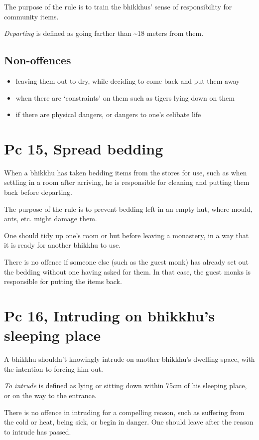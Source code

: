 The purpose of the rule is to train the bhikkhus' sense of
responsibility for community items.

\emph{Departing} is defined as going farther than \textasciitilde18
meters from them.

\subsection{Non-offences}

\begin{itemize}
\tightlist
\item
  leaving them out to dry, while deciding to come back and put them away
\item
  when there are `constraints' on them such as tigers lying down on them
\item
  if there are physical dangers, or dangers to one's celibate life
\end{itemize}

\section{Pc 15, Spread bedding}

When a bhikkhu has taken bedding items from the stores for use, such as
when settling in a room after arriving, he is responsible for cleaning
and putting them back before departing.

The purpose of the rule is to prevent bedding left in an empty hut,
where mould, ants, etc. might damage them.

One should tidy up one's room or hut before leaving a monastery, in a
way that it is ready for another bhikkhu to use.

There is no offence if someone else (such as the guest monk) has already
set out the bedding without one having asked for them. In that case, the
guest monks is responsible for putting the items back.

\section{Pc 16, Intruding on bhikkhu's sleeping place}

A bhikkhu shouldn't knowingly intrude on another bhikkhu's dwelling
space, with the intention to forcing him out.

\emph{To intrude} is defined as lying or sitting down within 75cm of his
sleeping place, or on the way to the entrance.

There is no offence in intruding for a compelling reason, such as
suffering from the cold or heat, being sick, or begin in danger. One
should leave after the reason to intrude has passed.

